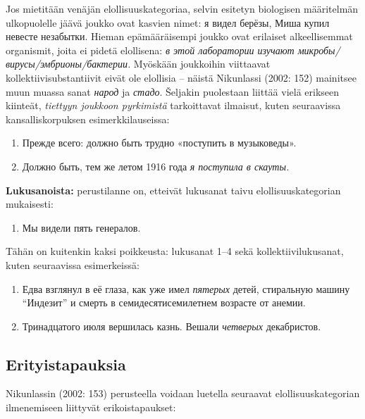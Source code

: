\documentclass[]{scrreprt}
\providecommand{\tightlist}{%
  \setlength{\itemsep}{0pt}\setlength{\parskip}{0pt}}
\begin{document}
Jos mietitään venäjän elollisuuskategoriaa, selvin esitetyn biologisen
määritelmän ulkopuolelle jäävä joukko ovat kasvien nimet: я видел
берёзы, Миша купил невесте незабытки. Hieman epämääräisempi joukko ovat
erilaiset alkeellisemmat organismit, joita ei pidetä elollisena: \emph{в
этой лаборатории изучают микробы/вирусы/эмбрионы/бактерии.} Myöskään
joukkoihin viittaavat kollektiivisubstantiivit eivät ole elollisia --
näistä Nikunlassi (2002: 152) mainitsee muun muassa sanat \emph{народ}
ja \emph{стадо}. Šeljakin puolestaan liittää vielä erikseen kiinteät,
\emph{tiettyyn joukkoon pyrkimistä} tarkoittavat ilmaisut, kuten
seuraavissa kansalliskorpuksen esimerkkilauseissa:

\begin{enumerate}
\def\labelenumi{(\arabic{enumi})}
\setcounter{enumi}{110}
\tightlist
\item
  Прежде всего: должно быть трудно «поступить в музыковеды».
\item
  Должно быть, тем же летом 1916 года \emph{я поступила в скауты.}
\end{enumerate}

\textbf{Lukusanoista:} perustilanne on, etteivät lukusanat taivu
elollisuuskategorian mukaisesti:

\begin{enumerate}
\def\labelenumi{(\arabic{enumi})}
\setcounter{enumi}{112}
\tightlist
\item
  Мы видели пять генералов.
\end{enumerate}

Tähän on kuitenkin kaksi poikkeusta: lukusanat 1--4 sekä
kollektiivilukusanat, kuten seuraavissa esimerkeissä:

\begin{enumerate}
\def\labelenumi{(\arabic{enumi})}
\setcounter{enumi}{113}
\tightlist
\item
  Едва взглянул в её глаза, как уже имел \emph{пятерых} детей,
  стиральную машину ``Индезит'' и смерть в семидесятисемилетнем возрасте
  от анемии.
\item
  Тринадцатого июля вершилась казнь. Вешали \emph{четверых} декабристов.
\end{enumerate}

\subsection{Erityistapauksia}\label{erityistapauksia}

Nikunlassin (2002: 153) perusteella voidaan luetella seuraavat
elollisuuskategorian ilmenemiseen liittyvät erikoistapaukset:
\end{document}
